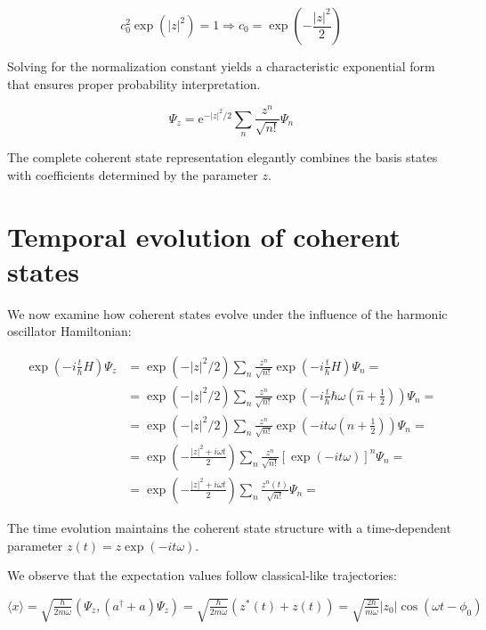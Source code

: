\begin{equation}
c_{0}^{2} \exp \left(|z|^{2}\right)=1 \Longrightarrow c_{0}=\exp \left(-\frac{|z|^{2}}{2}\right)
\end{equation}

Solving for the normalization constant yields a characteristic exponential form that ensures proper probability interpretation.

\begin{equation}
\Psi_{z}=\mathrm{e}^{-|z|^{2} / 2} \sum_{n} \frac{z^{n}}{\sqrt{n!}} \Psi_{n}
\end{equation}

The complete coherent state representation elegantly combines the basis states with coefficients determined by the parameter $z$.

\section{Temporal evolution of coherent states}
We now examine how coherent states evolve under the influence of the harmonic oscillator Hamiltonian:

\begin{align}
\exp \left(-i \frac{t}{\hbar} H\right) \Psi_{z} & =\exp \left(-|z|^{2} / 2\right) \sum_{n} \frac{z^{n}}{\sqrt{n!}} \exp \left(-i \frac{t}{\hbar} H\right) \Psi_{n}= \\
& =\exp \left(-|z|^{2} / 2\right) \sum_{n} \frac{z^{n}}{\sqrt{n!}} \exp \left(-i \frac{t}{\hbar} \hbar \omega\left(\hat{n}+\frac{1}{2}\right)\right) \Psi_{n}= \\
& =\exp \left(-|z|^{2} / 2\right) \sum_{n} \frac{z^{n}}{\sqrt{n!}} \exp \left(-i t \omega\left(n+\frac{1}{2}\right)\right) \Psi_{n}= \\
& =\exp \left(-\frac{|z|^{2}+i \omega t}{2}\right) \sum_{n} \frac{z^{n}}{\sqrt{n!}}[\exp (-i t \omega)]^{n} \Psi_{n}= \\
& =\exp \left(-\frac{|z|^{2}+i \omega t}{2}\right) \sum_{n} \frac{z^{n}(t)}{\sqrt{n!}} \Psi_{n}=
\end{align}

The time evolution maintains the coherent state structure with a time-dependent parameter $z(t)=z \exp (-i t \omega)$.

We observe that the expectation values follow classical-like trajectories:

$\langle x\rangle=\sqrt{\frac{\hbar}{2 m \omega}}\left(\Psi_{z},\left(a^{\dagger}+a\right) \Psi_{z}\right)=\sqrt{\frac{\hbar}{2 m \omega}}\left(z^{*}(t)+z(t)\right)=\sqrt{\frac{2 \hbar}{m \omega}}\left|z_{0}\right| \cos \left(\omega t-\phi_{0}\right)$

